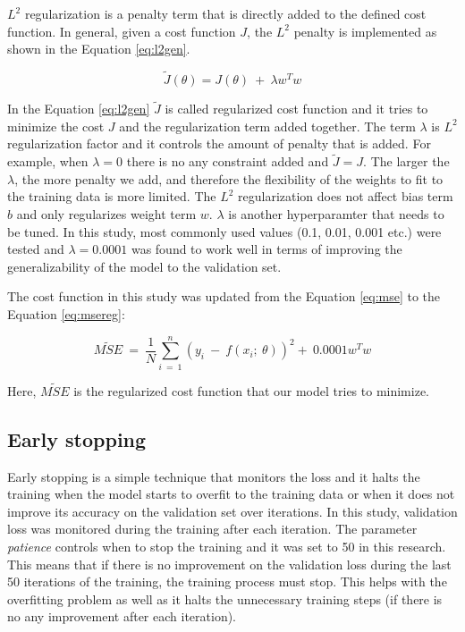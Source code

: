 \documentclass[a4paper, twoside]{templates/ociamthesis}
\begin{document}
\(L^{2}\) regularization is a penalty term that is directly added to the defined cost function. In general, given a cost function \(J\), the \(L^{2}\) penalty is implemented as shown in the Equation \eqref{eq:l2gen}.

\begin{equation}
\tilde{J}(\theta) = J\left(\theta\right)\ +\ \lambda w^Tw
\label{eq:l2gen}
\end{equation}

In the Equation \eqref{eq:l2gen} \(\tilde{J}\) is called regularized cost function and it tries to minimize the cost \(J\) and the regularization term added together. The term \(\lambda\) is \(L^{2}\) regularization factor and it controls the amount of penalty that is added. For example, when \(\lambda = 0\) there is no any constraint added and \(\tilde{J} = J\). The larger the \(\lambda\), the more penalty we add, and therefore the flexibility of the weights to fit to the training data is more limited. The \(L^{2}\) regularization does not affect bias term \(b\) and only regularizes weight term \(w\). \(\lambda\) is another hyperparamter that needs to be tuned. In this study, most commonly used values (0.1, 0.01, 0.001 etc.) were tested and \(\lambda = 0.0001\) was found to work well in terms of improving the generalizability of the model to the validation set.

The cost function in this study was updated from the Equation \eqref{eq:mse} to the Equation \eqref{eq:msereg}:

\begin{equation}
\tilde{MSE}\ =\ \frac{1}{N}\sum_{i\ =\ 1}^n\left(y_i\ -\ f\left(x_i;\ \theta\right)\right)^2 +\ 0.0001 w^Tw
\label{eq:msereg}
\end{equation}

Here, \(\tilde{MSE}\) is the regularized cost function that our model tries to minimize.

\hypertarget{early-stopping}{%
\subsection{Early stopping}\label{early-stopping}}

Early stopping is a simple technique that monitors the loss and it halts the training when the model starts to overfit to the training data or when it does not improve its accuracy on the validation set over iterations. In this study, validation loss was monitored during the training after each iteration. The parameter \emph{patience} controls when to stop the training and it was set to 50 in this research. This means that if there is no improvement on the validation loss during the last 50 iterations of the training, the training process must stop. This helps with the overfitting problem as well as it halts the unnecessary training steps (if there is no any improvement after each iteration).
\end{document}
